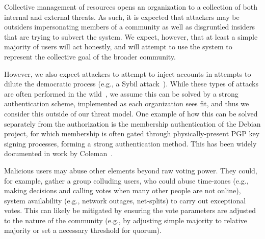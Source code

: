 Collective management of resources opens an organization to a collection of both
internal and external threats. As such, it is expected that attackers may be
outsiders impersonating members of a community as well as disgruntled insiders
that are trying to subvert the system. We expect, however, that at least a
simple majority of users will act honestly, and will attempt to use the system
to  represent the collective goal of the broader community.

However, we also expect attackers to attempt to inject accounts in attempts to
dilute the democratic process (e.g., a Sybil attack~\cite{sybil1, sybil2}).
While these types of attacks are often performed in the wild~\cite{197120},
we assume this can be solved by a strong authentication scheme, implemented as
each organization sees fit, and thus we consider this outside of our threat
model. One example of how this can be solved separately from the authorization
is the membership authentication of the Debian project, for which membership is
often gated through physically-present PGP key signing processes, forming a
strong authentication method. This has been widely documented in work by
Coleman~\cite{coleman-oss}. 

Malicious users may abuse other elements beyond raw voting power. They could,
for example, gather a group colluding users, who could abuse time-zones (e.g.,
making decisions and calling votes when many other people are not online),
system availability (e.g., network outages, net-splits) to carry out exceptional
votes. This can likely be mitigated by ensuring the vote parameters are adjusted
to the nature of the community (e.g., by adjusting simple majority to relative
majority or set a necessary threshold for quorum).
